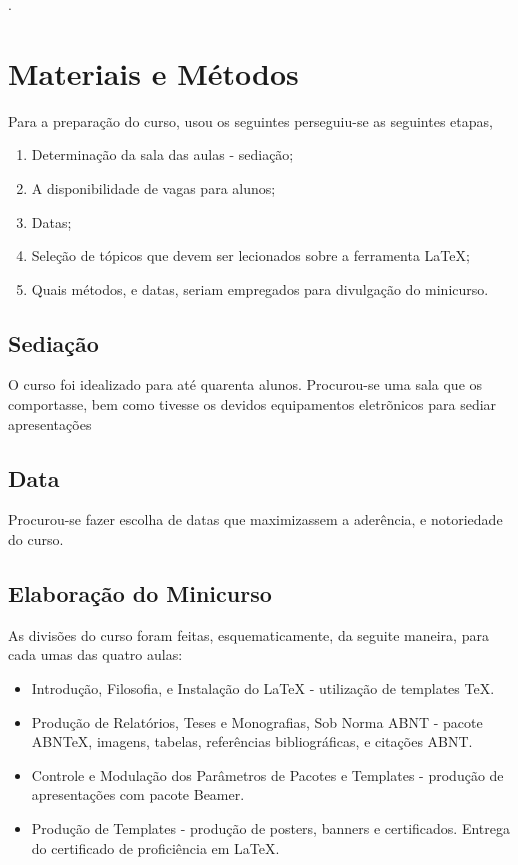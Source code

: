 \documentclass[
	12pt,				%
	openright,			%
	oneside,			%
	a4paper,			%
        brazil,				%
	]{abntex2}
\begin{document}
 \cite{baramidze2014} \cite{hwang1995}.

\chapter{Materiais e Métodos}

Para a preparação do curso, usou os seguintes perseguiu-se as
seguintes etapas,

\begin{enumerate}
\item Determinação da sala das aulas - sediação;
\item A disponibilidade de vagas para alunos;
\item Datas;
\item Seleção de tópicos que devem ser lecionados sobre a ferramenta
  \LaTeX;
\item Quais métodos, e datas, seriam empregados para divulgação do minicurso.
\end{enumerate}

\section{Sediação}
O curso foi idealizado para até quarenta alunos. Procurou-se uma sala
que os comportasse, bem como tivesse os devidos equipamentos
eletrõnicos para sediar apresentações



\section{Data}
Procurou-se fazer escolha de datas que maximizassem a aderência, e
notoriedade do curso.


\section{Elaboração do Minicurso}

As divisões do curso foram feitas, esquematicamente, da seguite maneira, para cada umas
das quatro aulas:

\begin{itemize}
\item Introdução, Filosofia, e Instalação do LaTeX - utilização de templates TeX.
\item Produção de Relatórios, Teses e Monografias, Sob Norma ABNT -
  pacote ABNTeX, imagens, tabelas, referências bibliográficas, e
  citações ABNT.
\item Controle e Modulação dos Parâmetros de Pacotes e Templates - produção de apresentações com pacote Beamer.
\item Produção de Templates - produção de posters, banners e certificados.  Entrega do certificado de proficiência em LaTeX.
\end{itemize}
\end{document}
